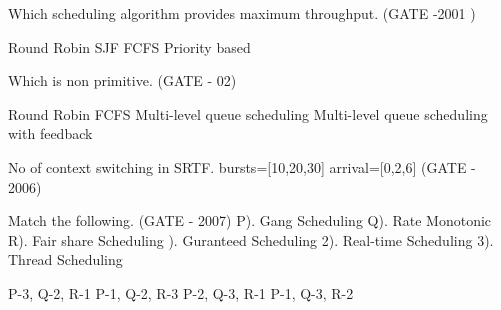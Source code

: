 \begin{minipage}{\linewidth}

  \question Which scheduling algorithm provides maximum throughput. (GATE -2001 )

  \begin{oneparchoices}
    \choice Round Robin
    \choice SJF
    \choice FCFS
    \choice Priority based
  \end{oneparchoices}

  \end{minipage}

\vspace{0.08in}



\begin{minipage}{\linewidth}

  \question Which is non primitive. (GATE - 02)

  \begin{choices}
    \choice Round Robin
    \choice FCFS
    \choice Multi-level queue scheduling
    \choice Multi-level queue scheduling with feedback
  \end{choices}

  \end{minipage}

\vspace{0.08in}



\begin{minipage}{\linewidth}

  \question No of context switching in SRTF. bursts=[10,20,30] arrival=[0,2,6] (GATE - 2006)

  \begin{oneparchoices}
  \end{oneparchoices}

  \end{minipage}

\vspace{0.08in}



\begin{minipage}{\linewidth}

  \question Match the following. (GATE - 2007) \newline
   P). Gang Scheduling  Q). Rate Monotonic  R). Fair share Scheduling ). Guranteed Scheduling 2). Real-time Scheduling 3). Thread Scheduling
  \begin{choices}
    \choice P-3, Q-2, R-1
    \choice P-1, Q-2, R-3
    \choice P-2, Q-3, R-1
    \choice P-1, Q-3, R-2
  \end{choices}


  \end{minipage}

